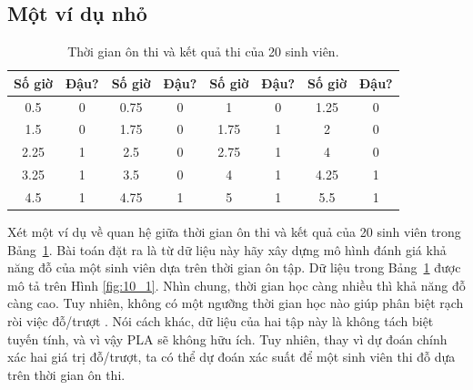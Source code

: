 \subsection{Một ví dụ nhỏ}
\begin{table}[]
\centering
\caption{Thời gian ôn thi và kết quả thi của 20 sinh viên. }
\label{tab:10_1}
\begin{tabular}{|c|c||c|c||c|c||c|c|}
\hline
\textbf{Số giờ} & \textbf{Đậu?} & \textbf{Số giờ} & \textbf{Đậu?} & \textbf{Số giờ} & \textbf{Đậu?} & \textbf{Số giờ} & \textbf{Đậu?} \\ \hline \hline 
0.5            & 0             & 0.75           & 0             & 1              & 0             & 1.25           & 0             \\ \hline
1.5            & 0             & 1.75           & 0             & 1.75           & 1             & 2              & 0             \\ \hline
2.25           & 1             & 2.5            & 0             & 2.75           & 1             & 4              & 0             \\ \hline
3.25           & 1             & 3.5            & 0             & 4              & 1             & 4.25           & 1             \\ \hline
4.5            & 1             & 4.75           & 1             & 5              & 1             & 5.5            & 1             \\ \hline
\end{tabular}
\end{table}

Xét một ví dụ về quan hệ giữa thời gian ôn thi và kết quả của 20 sinh
viên trong Bảng~\ref{tab:10_1}. Bài toán đặt ra là từ dữ liệu này hãy
xây dựng mô hình đánh giá khả năng đỗ của một sinh viên dựa trên thời gian
ôn tập. Dữ liệu trong Bảng~\ref{tab:10_1} được mô tả trên Hình \ref{fig:10_1}.
Nhìn chung, thời gian học càng nhiều thì khả năng đỗ càng cao. Tuy nhiên, không
có một ngưỡng thời gian học nào giúp phân biệt rạch ròi việc đỗ/trượt . Nói cách
khác, dữ liệu của hai tập này là không tách biệt tuyến tính, và vì vậy PLA sẽ
không hữu ích. Tuy nhiên, thay vì dự đoán chính xác hai giá trị đỗ/trượt,
ta có thể dự đoán xác suất để một sinh viên thi đỗ dựa trên thời gian ôn thi.

